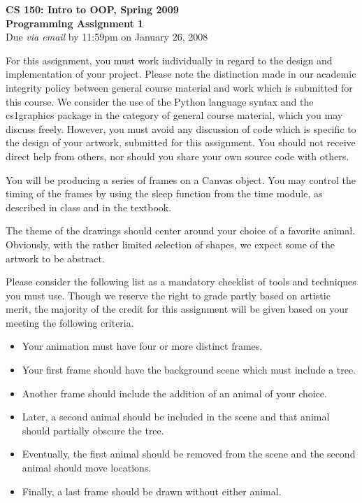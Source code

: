 \documentclass[11pt]{article}
\begin{document}

\begin{center}
\LARGE \textbf{CS 150: Intro to OOP, Spring 2009}
\\
\textbf{Programming Assignment 1}
\\[1ex]
\Large Due \emph{via email} by 11:59pm on January 26, 2008\\

\end{center}


For this assignment, you must work individually in regard to the
design and implementation of your project. Please note the
distinction made in our academic integrity policy between general
course material and work which is submitted for this course. We
consider the use of the Python language syntax and the cs1graphics
package in the category of general course material, which you may
discuss freely. However, you must avoid any discussion of code which
is specific to the design of your artwork, submitted for this
assignment. You should not receive direct help from others, nor
should you share your own source code with others.

You will be producing a series of frames on a Canvas object. You may
control the timing of the frames by using the sleep function from
the time module, as described in class and in the textbook.

The theme of the drawings should center around your choice of a
favorite animal. Obviously, with the rather limited selection of
shapes, we expect some of the artwork to be abstract.

Please consider the following list as a mandatory checklist of tools
and techniques you must use. Though we reserve the right to grade
partly based on artistic merit, the majority of the credit for this
assignment will be given based on your meeting the following
criteria.

\begin{itemize}
\item Your animation must have four or more distinct frames.

\item Your first frame should have the background scene which must
include a tree.

\item Another frame should include the addition of
an animal of your choice.

\item Later, a second animal should be included in the scene and that
animal should partially obscure the tree.

\item Eventually, the first animal should be removed from the scene
and the second animal should move locations.

\item Finally, a last frame should be drawn without either animal.

\end{itemize}
\end{document}
